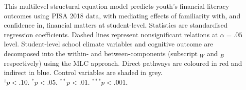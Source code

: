 {
}{This multilevel structural equation model predicts youth's financial literacy outcomes using PISA 2018 data, with mediating effects of familiarity with, and confidence in, financial matters at student-level. Statistics are standardised regression coefficients. Dashed lines represent nonsignificant relations at $\alpha=.05$ level. Student-level school climate variables and cognitive outcome are decomposed into the within- and between-components (subscript $_W$ and $_B$ respectively) using the MLC approach. Direct pathways are coloured in red and indirect in blue. Control variables are shaded in grey.\\
$^\dagger p < .10$. $^* p < .05$. $^{**} p < .01$. $^{***} p < .001$.}
